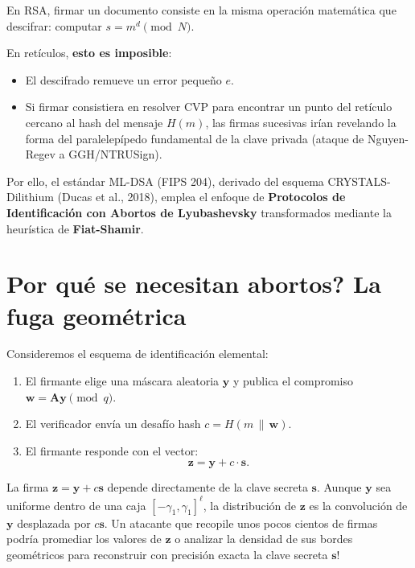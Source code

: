 \documentclass[11pt,a4paper,twoside,openright]{book}
\theoremstyle{plain}
\theoremstyle{definition}
\theoremstyle{remark}
\newcommand{\vv}[1]{\mathbf{#1}}
\newcommand{\mm}[1]{\mathbf{#1}}
\newcommand{\MLDSA}{\textsf{ML-DSA}}
\begin{document}
En RSA, firmar un documento consiste en la misma operaci\'on matem\'atica que descifrar: computar $s = m^d \pmod N$. 

En ret\'iculos, \textbf{esto es imposible}:
\begin{itemize}
  \item El descifrado remueve un error peque\~no $e$.
  \item Si firmar consistiera en resolver CVP para encontrar un punto del ret\'iculo cercano al hash del mensaje $H(m)$, las firmas sucesivas ir\'ian revelando la forma del paralelep\'ipedo fundamental de la clave privada (ataque de Nguyen-Regev a GGH/NTRUSign).
\end{itemize}

Por ello, el est\'andar \MLDSA{} (FIPS 204), derivado del esquema CRYSTALS-Dilithium (Ducas et al., 2018), emplea el enfoque de \textbf{Protocolos de Identificaci\'on con Abortos de Lyubashevsky} transformados mediante la heur\'istica de \textbf{Fiat-Shamir}.

\section{\textquestiondown Por qu\'e se necesitan abortos? La fuga geom\'etrica}

Consideremos el esquema de identificaci\'on elemental:
\begin{enumerate}
  \item El firmante elige una m\'ascara aleatoria $\vv{y}$ y publica el compromiso $\vv{w} = \mm{A}\vv{y} \pmod q$.
  \item El verificador env\'ia un desaf\'io hash $c = H(m \,\|\, \vv{w})$.
  \item El firmante responde con el vector:
  \[
    \vv{z} = \vv{y} + c \cdot \vv{s}.
  \]
\end{enumerate}

\begin{errorcomun}
La firma $\vv{z} = \vv{y} + c\vv{s}$ depende directamente de la clave secreta $\vv{s}$. Aunque $\vv{y}$ sea uniforme dentro de una caja $[-\gamma_1, \gamma_1]^\ell$, la distribuci\'on de $\vv{z}$ es la convoluci\'on de $\vv{y}$ desplazada por $c\vv{s}$. 
Un atacante que recopile unos pocos cientos de firmas podr\'ia promediar los valores de $\vv{z}$ o analizar la densidad de sus bordes geom\'etricos para reconstruir con precisi\'on exacta la clave secreta $\vv{s}$!
\end{errorcomun}
\end{document}
